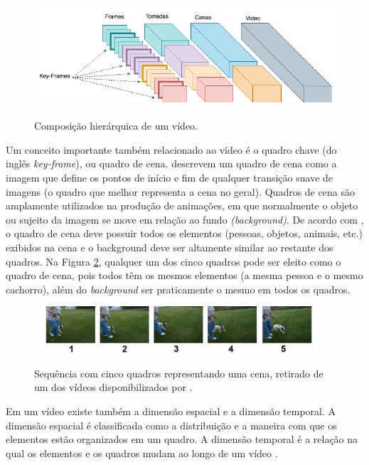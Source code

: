      \begin{figure}[!htb]
      \centering
      \caption{Composição hierárquica de um vídeo.}
       \includegraphics[width=\textwidth]{dados/figuras/video_structure.png}
      \label{fig:video_sctructure}
    \end{figure}   

       Um conceito importante também relacionado ao vídeo é o quadro chave (do inglês \emph{key-frame}), ou quadro de cena.  descrevem um quadro de cena como a imagem que define os pontos de início e fim de qualquer transição suave de imagens (o quadro que melhor representa a cena no geral). Quadros de cena são amplamente utilizados na produção de animações, em que normalmente o objeto ou sujeito da imagem se move em relação ao fundo \textit{(background)}. De acordo com , o quadro de cena deve possuir todos os elementos (pessoas, objetos, animais, etc.) exibidos na cena e o background deve ser altamente similar ao restante dos quadros. Na Figura \ref{fig:quadro_cena}, qualquer um dos cinco quadros pode ser eleito como o quadro de cena, pois todos têm os mesmos elementos (a mesma pessoa e o mesmo cachorro), além do \textit{background} ser praticamente o mesmo em todos os quadros.

 \begin{figure}[!htb]
      \centering
      \caption{Sequência com cinco quadros representando uma cena, retirado de um dos vídeos disponibilizados por \cite{reddy2013recognizing}.}
       \includegraphics[width=0.96\textwidth]{dados/figuras/keyframe.png}
      \label{fig:quadro_cena}
    \end{figure}   
    

    
    Em um vídeo existe também a dimensão espacial e a dimensão temporal. A dimensão espacial é classificada como a distribuição e a maneira com que os elementos estão organizados em um quadro. A dimensão temporal é a relação na qual os elementos e os quadros mudam ao longo de um vídeo \cite{hampapur2001comparison}.
    
